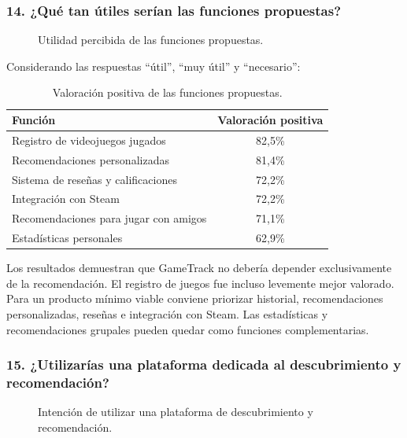 \subsubsection*{14. ¿Qué tan útiles serían las funciones propuestas?}

\begin{figure}[H]
	\centering
	\caption{Utilidad percibida de las funciones propuestas.}
	\label{fig:enc-p14}
\end{figure}

Considerando las respuestas \enquote{útil}, \enquote{muy útil} y \enquote{necesario}:

\begin{table}[ht]
	\caption{Valoración positiva de las funciones propuestas.}
	\label{tab:valoracion_funciones}
	\centering
	\begin{tabular}{|l|c|}
		\hline
		\textbf{Función} & \textbf{Valoración positiva} \\
		\hline
		Registro de videojuegos jugados & 82,5\% \\
		Recomendaciones personalizadas & 81,4\% \\
		Sistema de reseñas y calificaciones & 72,2\% \\
		Integración con Steam & 72,2\% \\
		Recomendaciones para jugar con amigos & 71,1\% \\
		Estadísticas personales & 62,9\% \\
		\hline
	\end{tabular}
\end{table}

Los resultados demuestran que GameTrack no debería depender exclusivamente de la recomendación. El registro de juegos fue incluso levemente mejor valorado. Para un producto mínimo viable conviene priorizar historial, recomendaciones personalizadas, reseñas e integración con Steam. Las estadísticas y recomendaciones grupales pueden quedar como funciones complementarias.

\subsubsection*{15. ¿Utilizarías una plataforma dedicada al descubrimiento y recomendación?}

\begin{figure}[H]
	\centering
	\caption{Intención de utilizar una plataforma de descubrimiento y recomendación.}
	\label{fig:enc-p15}
\end{figure}

